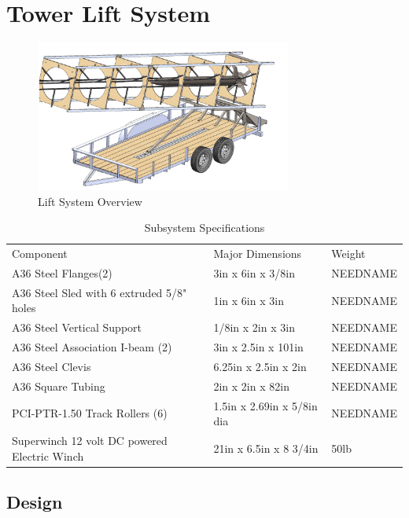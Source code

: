 \documentclass[10pt,a4paper]{article}
\begin{document}
	
\section{Tower Lift System}

\begin{figure}[h!]
	\centering
	\includegraphics[width=0.75\textwidth]{./figs/Overview.png}
	\caption{Lift System Overview}
	\label{fig:overview}
\end{figure}


\begin{table}[h!]
		\centering
		\begin{tabular}{l l l}
			Component & Major Dimensions & Weight \\
			A36 Steel Flanges(2) & 3in x 6in x 3/8in  & NEEDNAME \\
			A36 Steel Sled with 6 extruded 5/8" holes & 1in x 6in x 3in & NEEDNAME \\
			A36 Steel Vertical Support & 1/8in x 2in x 3in & NEEDNAME\\
			A36 Steel Association I-beam (2) & 3in x 2.5in x 101in & NEEDNAME\\
			A36 Steel Clevis & 6.25in x 2.5in x 2in & NEEDNAME\\
			A36 Square Tubing & 2in x 2in x 82in & NEEDNAME\\
			PCI-PTR-1.50 Track Rollers (6) & 1.5in x 2.69in x 5/8in dia & NEEDNAME\\
			Superwinch 12 volt DC powered Electric Winch & 21in x 6.5in x 8 3/4in & 50lb \\
			
			
		\end{tabular}
		\caption{Subsystem Specifications}
		\label{tab:example}
\end{table}


\subsection{Design}
\end{document}
